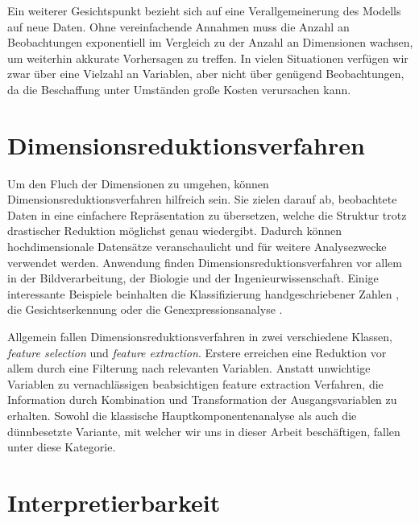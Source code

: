 Ein weiterer Gesichtspunkt bezieht sich auf eine Verallgemeinerung des Modells auf neue Daten. Ohne vereinfachende Annahmen muss die Anzahl an Beobachtungen exponentiell im Vergleich zu der Anzahl an Dimensionen wachsen, um weiterhin akkurate Vorhersagen zu treffen. In vielen Situationen verfügen wir zwar über eine Vielzahl an Variablen, aber nicht über genügend Beobachtungen, da die Beschaffung unter Umständen große Kosten verursachen kann. 




\section{Dimensionsreduktionsverfahren}

Um den Fluch der Dimensionen zu umgehen, können Dimensionsreduktionsverfahren hilfreich sein. Sie zielen darauf ab, beobachtete Daten in eine einfachere Repräsentation zu übersetzen, welche die Struktur trotz drastischer Reduktion möglichst genau wiedergibt. Dadurch können hochdimensionale Datensätze veranschaulicht und für weitere Analysezwecke verwendet werden. Anwendung finden Dimensionsreduktionsverfahren vor allem in der Bildverarbeitung, der Biologie und der Ingenieurwissenschaft. Einige interessante Beispiele beinhalten die Klassifizierung handgeschriebener Zahlen \cite{hastie_elements}, die Gesichtserkennung \cite{hancock} oder die Genexpressionsanalyse \cite{alter}.

Allgemein fallen Dimensionsreduktionsverfahren in zwei verschiedene Klassen, \textit{feature selection} und \textit{feature extraction}. Erstere erreichen eine Reduktion vor allem durch eine Filterung nach relevanten Variablen. Anstatt unwichtige Variablen zu vernachlässigen beabsichtigen feature extraction Verfahren, die Information durch Kombination und Transformation der Ausgangsvariablen zu erhalten. Sowohl die klassische Hauptkomponentenanalyse als auch die dünnbesetzte Variante, mit welcher wir uns in dieser Arbeit beschäftigen, fallen unter diese Kategorie.




\section{Interpretierbarkeit}

